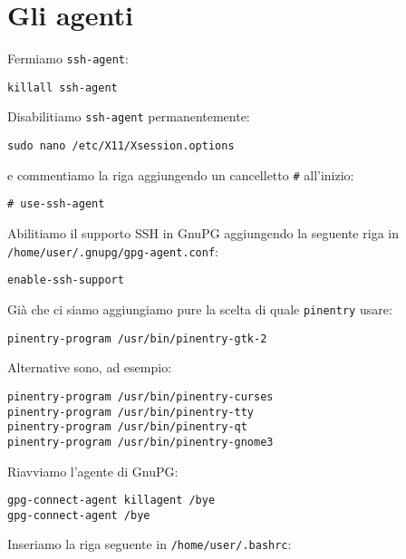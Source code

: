 \chapter{Gli agenti}

Fermiamo \texttt{ssh-agent}:

\begin{lstlisting}
killall ssh-agent
\end{lstlisting}

Disabilitiamo \texttt{ssh-agent} permanentemente:

\begin{lstlisting}
sudo nano /etc/X11/Xsession.options
\end{lstlisting}

e commentiamo la riga aggiungendo un cancelletto \texttt{\#} all'inizio:

\begin{lstlisting}
# use-ssh-agent
\end{lstlisting}

Abilitiamo il supporto SSH in GnuPG aggiungendo la seguente riga in
\texttt{/home/user/.gnupg/gpg-agent.conf}:

\begin{lstlisting}
enable-ssh-support
\end{lstlisting}

Già che ci siamo aggiungiamo pure la scelta di quale \texttt{pinentry} usare:

\begin{lstlisting}
pinentry-program /usr/bin/pinentry-gtk-2
\end{lstlisting}

Alternative sono, ad esempio:

\begin{lstlisting}
pinentry-program /usr/bin/pinentry-curses
pinentry-program /usr/bin/pinentry-tty
pinentry-program /usr/bin/pinentry-qt
pinentry-program /usr/bin/pinentry-gnome3
\end{lstlisting}

Riavviamo l'agente di GnuPG:

\begin{lstlisting}
gpg-connect-agent killagent /bye
gpg-connect-agent /bye
\end{lstlisting}

Inseriamo la riga seguente in \texttt{/home/user/.bashrc}:

